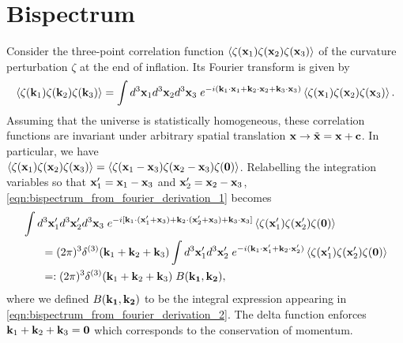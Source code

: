 \section{Bispectrum} \label{section:bispectrum}

Consider the three-point correlation function $\left< \zeta(\mathbf{x}_1) \zeta(\mathbf{x}_2) \zeta(\mathbf{x}_3) \right>$  of the curvature perturbation $\zeta$ at the end of inflation. Its Fourier transform is given by
\begin{align}
	\left< \zeta(\mathbf{k}_1) \zeta(\mathbf{k}_2) \zeta(\mathbf{k}_3) \right> = \int d^3\mathbf{x}_1 d^3\mathbf{x}_2 d^3\mathbf{x}_3 \; e^{-i(\mathbf{k}_1 \cdot \mathbf{x}_1 + \mathbf{k}_2 \cdot \mathbf{x}_2 + \mathbf{k}_3 \cdot \mathbf{x}_3 )} \left< \zeta(\mathbf{x}_1) \zeta(\mathbf{x}_2) \zeta(\mathbf{x}_3) \right>. \label{eqn:bispectrum_from_fourier_derivation_1}
\end{align}
Assuming that the universe is statistically homogeneous, these correlation functions are invariant under arbitrary spatial translation $\mathbf{x} \rightarrow \tilde{\mathbf{x}} = \mathbf{x} + \mathbf{c}$. In particular, we have \\${\left< \zeta(\mathbf{x}_1) \zeta(\mathbf{x}_2) \zeta(\mathbf{x}_3) \right> = \left< \zeta(\mathbf{x}_1 - \mathbf{x}_3) \zeta(\mathbf{x}_2 - \mathbf{x}_3) \zeta(\mathbf{0}) \right>}$. Relabelling the integration variables so that $\mathbf{x}'_1=\mathbf{x}_1-\mathbf{x}_3$ and $\mathbf{x}'_2=\mathbf{x}_2-\mathbf{x}_3$, \eqref{eqn:bispectrum_from_fourier_derivation_1} becomes
\begin{align}
	&\int d^3\vv{x}'_1 d^3\vv{x}'_2 d^3\vv{x}_3 \; e^{-i[ \vv{k}_1 \cdot (\vv{x}'_1 + \vv{x}_3) + \vv{k}_2 \cdot (\vv{x}'_2 + \vv{x}_3) + \vv{k}_3 \cdot \vv{x}_3 ]} \left< \zeta(\vv{x}'_1) \zeta(\vv{x}'_2) \zeta(\vv{0}) \right> \nonumber \\
	&\hspace{0.05\textwidth} = (2\pi)^3 \delta^{(3)}(\vv{k}_1 + \vv{k}_2 + \vv{k}_3) \int d^3\vv{x}'_1 d^3\vv{x}'_2 \; e^{-i( \vv{k}_1 \cdot \vv{x}'_1 + \vv{k}_2 \cdot \vv{x}'_2)} \left< \zeta(\vv{x}'_1) \zeta(\vv{x}'_2) \zeta(\vv{0}) \right> \label{eqn:bispectrum_from_fourier_derivation_2}\\
	&\hspace{0.05\textwidth} =: (2\pi)^3 \delta^{(3)}(\vv{k}_1 + \vv{k}_2 + \vv{k}_3) \; B(\vv{k_1}, \vv{k_2}), \label{eqn:bispectrum_from_fourier_derivation_3}
\end{align}
where we defined $B(\mathbf{k_1}, \mathbf{k_2})$ to be the integral expression appearing in \eqref{eqn:bispectrum_from_fourier_derivation_2}. The delta function enforces $\mathbf{k}_1 + \mathbf{k}_2 + \mathbf{k}_3 = \mathbf{0}$ which corresponds to the conservation of momentum.

